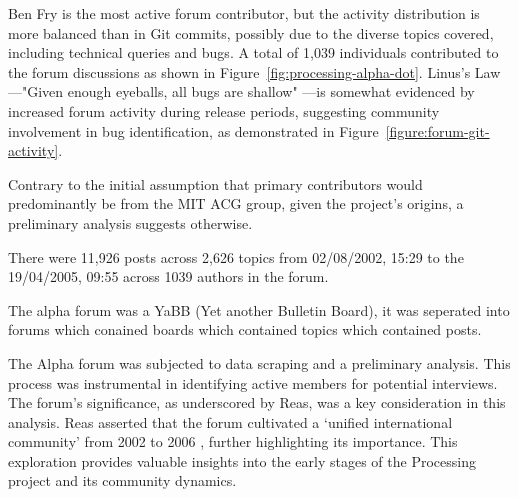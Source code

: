 Ben Fry is the most active forum contributor, but the activity distribution is more balanced than in Git commits, possibly due to the diverse topics covered, including technical queries and bugs. A total of 1,039 individuals contributed to the forum discussions as shown in Figure~\ref{fig:processing-alpha-dot}.
Linus's Law—"Given enough eyeballs, all bugs are shallow" \parencite[29]{raymondCathedralBazaar1999}—is somewhat evidenced by increased forum activity during release periods, suggesting community involvement in bug identification, as demonstrated in Figure~\ref{figure:forum-git-activity}.



Contrary to the initial assumption that primary contributors would predominantly be from the MIT ACG group, given the project's origins, a preliminary analysis suggests otherwise.



%
%
%
%

There were 11,926 posts across 2,626 topics from 02/08/2002, 15:29 to the 19/04/2005, 09:55 across 1039 authors in the forum.

The alpha forum was a YaBB (Yet another Bulletin Board), it was seperated into forums which conained boards which contained topics which contained posts.





The Alpha forum was subjected to data scraping and a preliminary analysis. This process was instrumental in identifying active members for potential interviews. The forum’s significance, as underscored by Reas, was a key consideration in this analysis. Reas asserted that the forum cultivated a ‘unified international community’ from 2002 to 2006 \parencite[331]{conradGraphicDesignPostdigital2021}, further highlighting its importance. This exploration provides valuable insights into the early stages of the Processing project and its community dynamics.

